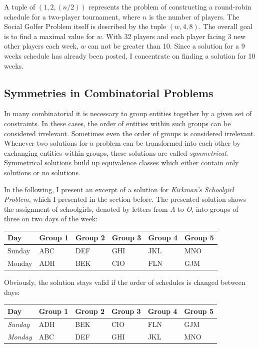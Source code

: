 \documentclass[a4paper]{scrartcl}
\begin{document}
A tuple of $(1,2,(n/2))$ represents the problem of constructing a round-robin schedule for a two-player tournament, where $n$ is the number of players. The Social Golfer Problem itself is described by the tuple $(w,4,8)$. The overall goal is to find a maximal value for $w$. With 32 players and each player facing 3 new other players each week, $w$ can not be greater than 10. Since a solution for a 9 weeks schedule has already been posted, I concentrate on finding a solution for 10 weeks.

\subsection{Symmetries in Combinatorial Problems}

In many combinatorial it is necessary to group entities together by a given set of constraints. In these cases, the order of entities within such groups can be considered irrelevant. Sometimes even the order of groups is considered irrelevant. Whenever two solutions for a problem can be transformed into each other by exchanging entities within groups, these solutions are called \emph{symmetrical}. Symmetrical solutions build up equivalence classes which either contain only solutions or no solutions\cite{Smith01}.

In the following, I present an excerpt of a solution for \emph{Kirkman's Schoolgirl Problem}, which I presented in the section before. The presented solution shows the assignment of schoolgirls, denoted by letters from \emph{A} to \emph{O}, into groups of three on two days of the week:

\begin{table}[h]
\centering
\begin{tabular}{ l | l  l  l l  l }
Day & Group 1 & Group 2 & Group 3 & Group 4 & Group 5 \\
\hline
Sunday & ABC & DEF & GHI & JKL & MNO \\
Monday & ADH  & BEK & CIO & FLN & GJM \\
\end{tabular}
\end{table}

Obviously, the solution stays valid if the order of schedules is changed between days:

\begin{table}[h]
\centering
\begin{tabular}{ l | l  l  l l  l }
Day & Group 1 & Group 2 & Group 3 & Group 4 & Group 5 \\
\hline
\emph{Sunday} & ADH  & BEK & CIO & FLN & GJM \\
\emph{Monday} & ABC & DEF & GHI & JKL & MNO \\
\end{tabular}
\end{table}
\end{document}
